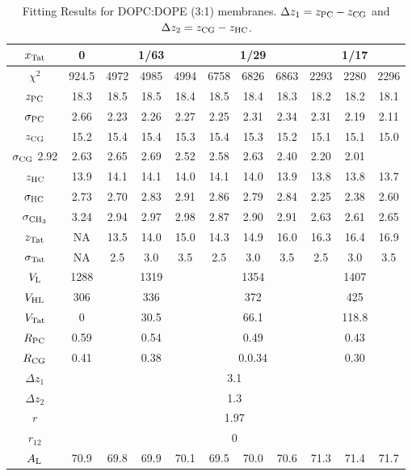 \begin{table}[htbp]
  \centering
  \begin{tabular}{|c|c|c|c|c|c|c|c|c|c|c|}
    \hline
    $x_\textrm{Tat}$ & 0 & \multicolumn{3}{c|}{1/63} & \multicolumn{3}{c|}{1/29} & \multicolumn{3}{c|}{1/17} \\
    \hline
    $\chi^2$ & 924.5 & 4972 & 4985 & 4994 & 6758 & 6826 & 6863 & 2293 & 2280 & 2296 \\ 
    \hline
    $z_\textrm{PC}$ & 18.3 & 18.5 & 18.5 & 18.4 & 18.5 & 18.4 & 18.3 & 18.2 & 18.2 & 18.1 \\
    $\sigma_\textrm{PC}$ & 2.66 & 2.23 & 2.26 & 2.27 & 2.25 & 2.31 & 2.34 & 2.31 & 2.19 & 2.11 \\
    $z_\textrm{CG}$ & 15.2 & 15.4 & 15.4 & 15.3 & 15.4 & 15.3 & 15.2 & 15.1 & 15.1 & 15.0 \\
    $\sigma_\textrm{CG}$ 2.92 & 2.63 & 2.65 & 2.69 & 2.52 & 2.58 & 2.63 & 2.40 & 2.20 & 2.01 \\
    $z_\textrm{HC}$ & 13.9 & 14.1 & 14.1 & 14.0 & 14.1 & 14.0 & 13.9 & 13.8 & 13.8 & 13.7 \\
    $\sigma_\textrm{HC}$ & 2.73 & 2.70 & 2.83 & 2.91 & 2.86 & 2.79 & 2.84 & 2.25 & 2.38 & 2.60 \\
    $\sigma_{\textrm{CH}_3}$ & 3.24 & 2.94 & 2.97 & 2.98 & 2.87 & 2.90 & 2.91 & 2.63 & 2.61 & 2.65 \\
    $z_\textrm{Tat}$ & NA & 13.5 & 14.0 & 15.0 & 14.3 & 14.9 & 16.0 & 16.3 & 16.4 & 16.9 \\
    $\sigma_\textrm{Tat}$ & NA & 2.5 & 3.0 & 3.5 & 2.5 & 3.0 & 3.5 & 2.5 & 3.0 & 3.5 \\ 
    \hline
    $V_\textrm{L}$ & 1288 & \multicolumn{3}{c|}{1319} & \multicolumn{3}{c|}{1354} & \multicolumn{3}{c|}{1407} \\ 
    $V_\textrm{HL}$ & 306 & \multicolumn{3}{c|}{336} & \multicolumn{3}{c|}{372} & \multicolumn{3}{c|}{425} \\
    $V_\textrm{Tat}$ & 0 & \multicolumn{3}{c|}{30.5} & \multicolumn{3}{c|}{66.1} & \multicolumn{3}{c|}{118.8} \\
    $R_\textrm{PC}$ & 0.59 & \multicolumn{3}{c|}{0.54} & \multicolumn{3}{c|}{0.49} & \multicolumn{3}{c|}{0.43} \\
    $R_\textrm{CG}$ & 0.41 & \multicolumn{3}{c|}{0.38} & \multicolumn{3}{c|}{0.0.34} & \multicolumn{3}{c|}{0.30} \\
    \hline
    $\Delta z_1$ & \multicolumn{10}{c|}{3.1} \\
    $\Delta z_2$ & \multicolumn{10}{c|}{1.3} \\
    $r$ & \multicolumn{10}{c|}{1.97} \\
    $r_{12}$ & \multicolumn{10}{c|}{0} \\
    \hline
    $A_\textrm{L}$ & 70.9 & 69.8 & 69.9 & 70.1 & 69.5 & 70.0 & 70.6 & 71.3 & 71.4 & 71.7 \\
    \hline
  \end{tabular}
  \caption{Fitting Results for DOPC:DOPE (3:1) membranes. $\Delta z_1 = z_\textrm{PC}-z_\textrm{CG}$
  and $\Delta z_2 = z_\textrm{CG}-z_\textrm{HC}$.}
  \label{tb:DOPCDOPE3to1_fit_results}
\end{table}
